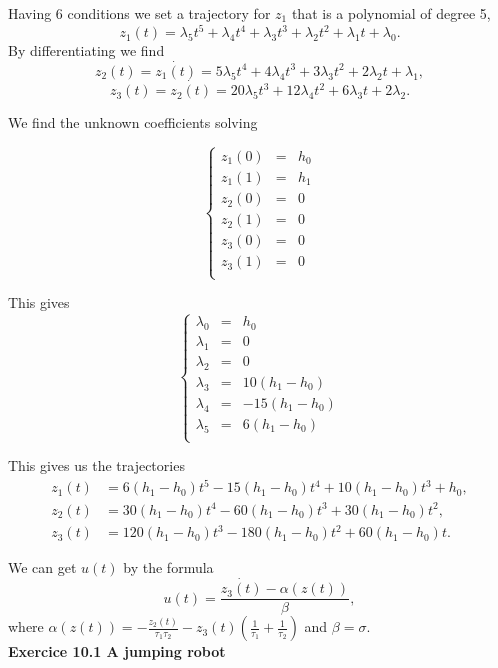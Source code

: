 Having $6$ conditions we set a trajectory for $z_{1}$ that is a polynomial of degree 5, 
$$z_{1}(t)=\lambda_{5} t^{5}+\lambda_{4} t^{4} + \lambda_{3} t^{3} + \lambda_{2} t^{2} +\lambda_{1} t+\lambda_{0}.$$
By differentiating we find
$$z_{2}(t)=\dot{z_{1}(t)}=5\lambda_{5} t^{4}+4\lambda_{4} t^{3} + 3\lambda_{3} t^{2} + 2\lambda_{2} t +\lambda_{1},$$
$$z_{3}(t)=\dot{z_{2}(t)}=20\lambda_{5} t^{3}+12\lambda_{4} t^{2} + 6\lambda_{3} t + 2\lambda_{2}.$$

We find the unknown coefficients solving

$$\left\{\begin{array}{ccc}
z_{1}(0) & = & h_{0}\\
z_{1}(1) & = & h_{1}\\
z_{2}(0) & = & 0\\
z_{2}(1) & = & 0\\
z_{3}(0) & = & 0\\
z_{3}(1) & = & 0\\
\end{array}\right.$$

This gives 
$$\left\{\begin{array}{ccc}
\lambda_{0} & = & h_{0}\\
\lambda_{1} & = & 0\\
\lambda_{2} & = & 0\\
\lambda_{3}& = & 10(h_{1}-h_{0})\\
\lambda_{4}& = & -15(h_{1}-h_{0})\\
\lambda_{5}& = & 6(h_{1}-h_{0})\\
\end{array}\right.$$



This gives us the trajectories
\begin{align*}
z_{1}(t)&=6(h_{1}-h_{0}) t^{5}-15(h_{1}-h_{0}) t^{4} + 10(h_{1}-h_{0}) t^{3} + h_{0},\\
z_{2}(t)&=30(h_{1}-h_{0}) t^{4}-60(h_{1}-h_{0}) t^{3} + 30(h_{1}-h_{0}) t^{2},\\
z_{3}(t)&=120(h_{1}-h_{0}) t^{3}-180(h_{1}-h_{0}) t^{2} + 60(h_{1}-h_{0}) t.
\end{align*}


We can get $u(t)$ by the formula
$$u(t)=\dfrac{\dot{z_{3}(t)}-\alpha(z(t))}{\beta},$$
where $\alpha(z(t))=-\frac{z_{2}(t)}{\tau_{1}\tau_{2}}-z_{3}(t)(\frac{1}{\tau_{1}}+\frac{1}{\tau_{2}})$ and $\beta=\sigma$.\\


\textbf{Exercice 10.1 A jumping robot}\\


